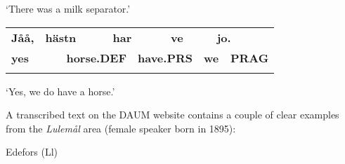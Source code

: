 \begin{styleTranslation}
‘There was a milk separator.’ 

\end{styleTranslation}

\begin{tabular}{llllllllll}
\lsptoprule
{\bfseries Jåå,} & \multicolumn{2}{l}{{\bfseries hästn}

} & \multicolumn{2}{l}{{\bfseries har}

} & \multicolumn{2}{l}{{\bfseries ve}

} & \multicolumn{2}{l}{{\bfseries jo.}

} & \\
\multicolumn{2}{l}{{\bfseries yes}

} & \multicolumn{2}{l}{{\bfseries horse.DEF}

} & \multicolumn{2}{l}{{\bfseries have.PRS}

} & \multicolumn{2}{l}{{\bfseries we}

} & \multicolumn{2}{l}{{\bfseries PRAG}

}\\
\lspbottomrule
\end{tabular}

\begin{styleTranslation}
‘Yes, we do have a horse.’ 

\end{styleTranslation}

\begin{styleBodyTextFirst}
A transcribed text on the DAUM website contains a couple of clear examples from the \textit{Lulemål} area (female speaker born in 1895):

\end{styleBodyTextFirst}


\begin{listWWNumileveli}
\item {}

\begin{styleExample}
Edefors (Ll)

\end{styleExample}

\end{listWWNumileveli}

